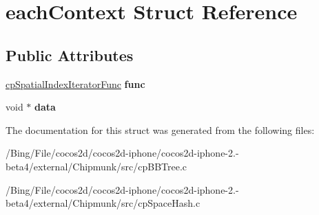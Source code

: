 \hypertarget{structeach_context}{\section{each\-Context Struct Reference}
\label{structeach_context}
}
\subsection*{Public Attributes}
\begin{DoxyCompactItemize}
\item 
\hypertarget{structeach_context_affa8e81bc9e5946c9198aa4dd3d5f096}{\hyperlink{group__cp_spatial_index_gaf46e9eeecddefacab2be48aadd5d1a1d}{cp\-Spatial\-Index\-Iterator\-Func} {\bfseries func}}\label{structeach_context_affa8e81bc9e5946c9198aa4dd3d5f096}

\item 
\hypertarget{structeach_context_a4a5be6843bc77f70aa37b24d89fa4530}{void $\ast$ {\bfseries data}}\label{structeach_context_a4a5be6843bc77f70aa37b24d89fa4530}

\end{DoxyCompactItemize}


The documentation for this struct was generated from the following files\-:\begin{DoxyCompactItemize}
\item 
/\-Bing/\-File/cocos2d/cocos2d-\/iphone/cocos2d-\/iphone-\/2.-\/beta4/external/\-Chipmunk/src/cp\-B\-B\-Tree.\-c\item 
/\-Bing/\-File/cocos2d/cocos2d-\/iphone/cocos2d-\/iphone-\/2.-\/beta4/external/\-Chipmunk/src/cp\-Space\-Hash.\-c\end{DoxyCompactItemize}
